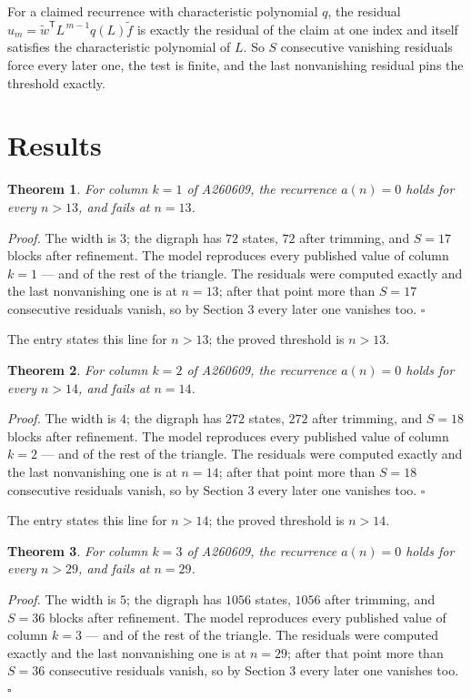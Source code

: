 \documentclass[11pt]{article}
\newtheorem{theorem}{Theorem}
\theoremstyle{definition}
\begin{document}
For a claimed recurrence with characteristic polynomial $q$, the residual $u_m = \tilde w^{\mathsf T}L^{\,m-1}q(L)\tilde f$ is exactly the residual of the claim at one index and itself satisfies the characteristic polynomial of $L$. So $S$ consecutive vanishing residuals force every later one, the test is finite, and the last nonvanishing residual pins the threshold exactly.

\section{Results}

\begin{theorem} For column $k = 1$ of A260609, the recurrence $a(n) = 0$ holds for every $n > 13$, and fails at $n = 13$.\end{theorem}

{\itshape Proof.} The width is $3$; the digraph has $72$ states, $72$ after trimming, and $S = 17$ blocks after refinement. The model reproduces every published value of column $k = 1$ --- and of the rest of the triangle. The residuals were computed exactly and the last nonvanishing one is at $n = 13$; after that point more than $S = 17$ consecutive residuals vanish, so by Section 3 every later one vanishes too. $\square$

The entry states this line for $n > 13$; the proved threshold is $n > 13$.

\begin{theorem} For column $k = 2$ of A260609, the recurrence $a(n) = 0$ holds for every $n > 14$, and fails at $n = 14$.\end{theorem}

{\itshape Proof.} The width is $4$; the digraph has $272$ states, $272$ after trimming, and $S = 18$ blocks after refinement. The model reproduces every published value of column $k = 2$ --- and of the rest of the triangle. The residuals were computed exactly and the last nonvanishing one is at $n = 14$; after that point more than $S = 18$ consecutive residuals vanish, so by Section 3 every later one vanishes too. $\square$

The entry states this line for $n > 14$; the proved threshold is $n > 14$.

\begin{theorem} For column $k = 3$ of A260609, the recurrence $a(n) = 0$ holds for every $n > 29$, and fails at $n = 29$.\end{theorem}

{\itshape Proof.} The width is $5$; the digraph has $1056$ states, $1056$ after trimming, and $S = 36$ blocks after refinement. The model reproduces every published value of column $k = 3$ --- and of the rest of the triangle. The residuals were computed exactly and the last nonvanishing one is at $n = 29$; after that point more than $S = 36$ consecutive residuals vanish, so by Section 3 every later one vanishes too. $\square$
\end{document}
